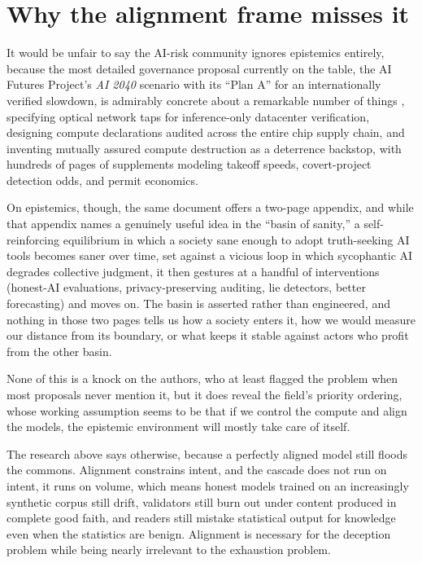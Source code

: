 \documentclass[11pt,letterpaper]{article}
\begin{document}
\section{Why the alignment frame misses it}

It would be unfair to say the AI-risk community ignores epistemics entirely, because the most detailed governance proposal currently on the table, the AI Futures Project's \emph{AI 2040} scenario with its ``Plan A'' for an internationally verified slowdown, is admirably concrete about a remarkable number of things \citep{ai2040}, specifying optical network taps for inference-only datacenter verification, designing compute declarations audited across the entire chip supply chain, and inventing mutually assured compute destruction as a deterrence backstop, with hundreds of pages of supplements modeling takeoff speeds, covert-project detection odds, and permit economics.

On epistemics, though, the same document offers a two-page appendix, and while that appendix names a genuinely useful idea in the ``basin of sanity,'' a self-reinforcing equilibrium in which a society sane enough to adopt truth-seeking AI tools becomes saner over time, set against a vicious loop in which sycophantic AI degrades collective judgment, it then gestures at a handful of interventions (honest-AI evaluations, privacy-preserving auditing, lie detectors, better forecasting) and moves on. The basin is asserted rather than engineered, and nothing in those two pages tells us how a society enters it, how we would measure our distance from its boundary, or what keeps it stable against actors who profit from the other basin.

None of this is a knock on the authors, who at least flagged the problem when most proposals never mention it, but it does reveal the field's priority ordering, whose working assumption seems to be that if we control the compute and align the models, the epistemic environment will mostly take care of itself.

The research above says otherwise, because a perfectly aligned model still floods the commons. Alignment constrains intent, and the cascade does not run on intent, it runs on volume, which means honest models trained on an increasingly synthetic corpus still drift, validators still burn out under content produced in complete good faith, and readers still mistake statistical output for knowledge even when the statistics are benign. Alignment is necessary for the deception problem while being nearly irrelevant to the exhaustion problem.
\end{document}
